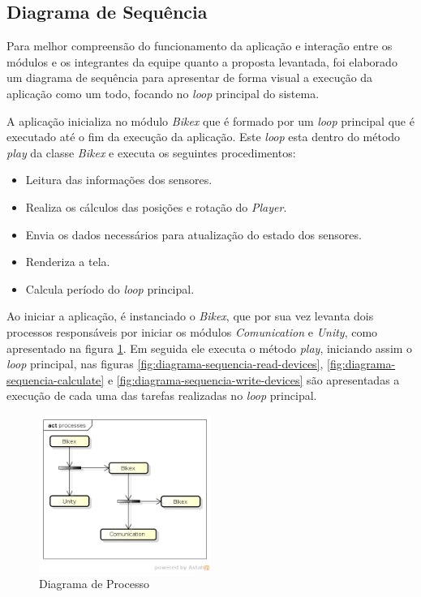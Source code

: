 \subsection{Diagrama de Sequência} %
\label{sec:diagrama_de_sequencia}

Para melhor compreensão do funcionamento da aplicação e interação entre os módulos e os integrantes da equipe quanto a proposta 
levantada, foi elaborado um diagrama de sequência para apresentar de forma visual a execução da aplicação como um todo, focando 
no \textit{loop} principal do sistema.

A aplicação inicializa no módulo \textit{Bikex} que é formado por um \textit{loop} principal que é executado até o fim da 
execução da aplicação. Este \textit{loop} esta dentro do método \textit{play} da classe \textit{Bikex} e executa os seguintes 
procedimentos:

\begin{itemize}
	\item Leitura das informações dos sensores.
	\item Realiza os cálculos das posições e rotação do \textit{Player}.
	\item Envia os dados necessários para atualização do estado dos sensores.
	\item Renderiza a tela.
	\item Calcula período do \textit{loop} principal.
\end{itemize}

Ao iniciar a aplicação, é  instanciado o \textit{Bikex}, que por sua vez levanta dois processos responsáveis por iniciar os módulos \textit{Comunication} e \textit{Unity}, como apresentado na figura \ref{fig:diagrama-processo}. Em seguida ele executa o método \textit{play}, iniciando assim o \textit{loop} principal, nas figuras \ref{fig:diagrama-sequencia-read-devices}, \ref{fig:diagrama-sequencia-calculate} e \ref{fig:diagrama-sequencia-write-devices} são apresentadas a execução de cada uma das tarefas realizadas no \textit{loop} principal. 

\begin{figure}[h]
  \centering
	\includegraphics[width=0.5\textwidth]{figuras/processes}
  \caption{Diagrama de Processo}
  \label{fig:diagrama-processo}
\end{figure}


